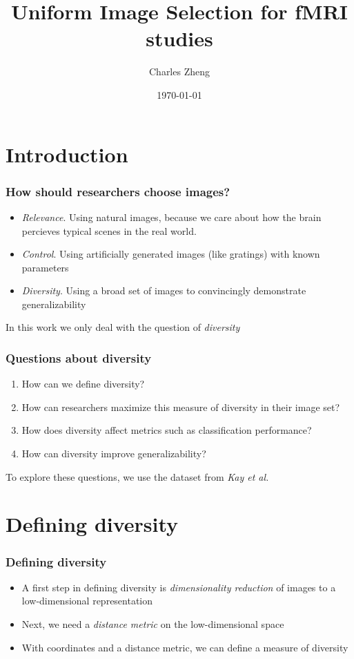 \documentclass{beamer}
\title[Experimental Design Project]{Uniform Image Selection for fMRI studies}
\author{Charles Zheng} %
\institute[Stanford] %
{Stanford University}
\date{\today} %
\begin{document}
\begin{frame}
\titlepage %
\end{frame}

\section{Introduction}

\begin{frame}
\frametitle{How should researchers choose images?}
\begin{itemize}
\item \emph{Relevance}. Using natural images, because we care about how the brain percieves typical scenes in the real world.
\item \emph{Control}. Using artificially generated images (like gratings) with known parameters
\item \emph{Diversity}. Using a broad set of images to convincingly demonstrate generalizability
\end{itemize}
In this work we only deal with the question of \emph{diversity}
\end{frame}

\begin{frame}
\frametitle{Questions about diversity}
\begin{enumerate}
\item How can we define diversity?
\item How can researchers maximize this measure of diversity in their image set?
\item How does diversity affect metrics such as classification performance?
\item How can diversity improve generalizability?
\end{enumerate}

To explore these questions, we use the dataset from \emph{Kay et al.}
\end{frame}

\section{Defining diversity}

\frame{\sectionpage}

\begin{frame}
\frametitle{Defining diversity}
\begin{itemize}
\item A first step in defining diversity is \emph{dimensionality reduction} of images to a low-dimensional representation
\item Next, we need a \emph{distance metric} on the low-dimensional space
\item With coordinates and a distance metric, we can define a measure of diversity
\end{itemize}
\end{frame}
\end{document}
